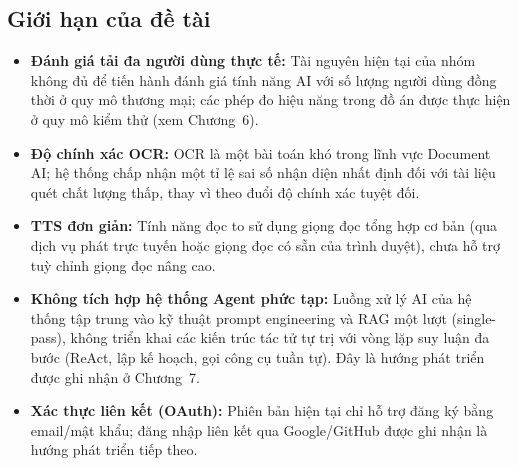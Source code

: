 \subsection{Giới hạn của đề tài}
\begin{itemize}
    \item \textbf{Đánh giá tải đa người dùng thực tế:} Tài nguyên hiện tại của nhóm không đủ để tiến hành đánh giá tính năng AI với số lượng người dùng đồng thời ở quy mô thương mại; các phép đo hiệu năng trong đồ án được thực hiện ở quy mô kiểm thử (xem Chương~6).
    \item \textbf{Độ chính xác OCR:} OCR là một bài toán khó trong lĩnh vực Document AI; hệ thống chấp nhận một tỉ lệ sai số nhận diện nhất định đối với tài liệu quét chất lượng thấp, thay vì theo đuổi độ chính xác tuyệt đối.
    \item \textbf{TTS đơn giản:} Tính năng đọc to sử dụng giọng đọc tổng hợp cơ bản (qua dịch vụ phát trực tuyến hoặc giọng đọc có sẵn của trình duyệt), chưa hỗ trợ tuỳ chỉnh giọng đọc nâng cao.
    \item \textbf{Không tích hợp hệ thống Agent phức tạp:} Luồng xử lý AI của hệ thống tập trung vào kỹ thuật prompt engineering và RAG một lượt (single-pass), không triển khai các kiến trúc tác tử tự trị với vòng lặp suy luận đa bước (ReAct, lập kế hoạch, gọi công cụ tuần tự). Đây là hướng phát triển được ghi nhận ở Chương~7.
    \item \textbf{Xác thực liên kết (OAuth):} Phiên bản hiện tại chỉ hỗ trợ đăng ký bằng email/mật khẩu; đăng nhập liên kết qua Google/GitHub được ghi nhận là hướng phát triển tiếp theo.
\end{itemize}
